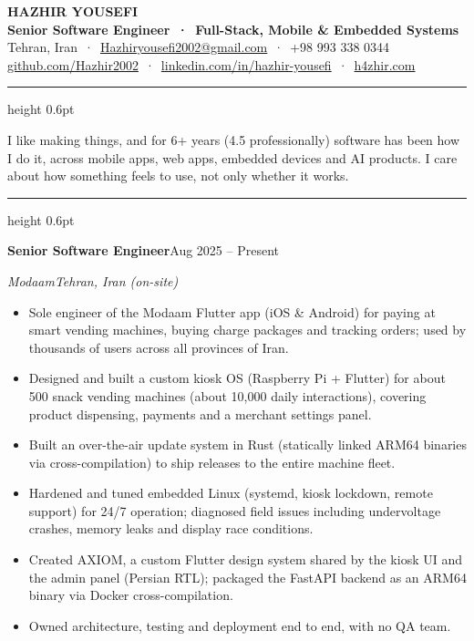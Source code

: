 \documentclass[10pt,a4paper]{article}
\renewcommand{\section}[1]{%
  \vspace{6pt}{\bfseries\color{accent}\MakeUppercase{#1}}\par\nointerlineskip\vspace{1.5pt}%
  {\color{accent}\hrule height 0.6pt}\vspace{3pt}}
\newcommand{\entry}[4]{%
  \vspace{3pt}\textbf{#1}\hfill #3\par
  \textit{#2}\hfill\textit{#4}\par\vspace{1pt}}
\begin{document}
\begin{center}
  {\fontsize{22}{26}\selectfont\bfseries HAZHIR YOUSEFI}\\[3pt]
  {\color{accent}\bfseries Senior Software Engineer \,·\, Full-Stack, Mobile \& Embedded Systems}\\[3pt]
  {\small Tehran, Iran \,·\,
  \href{mailto:Hazhiryousefi2002@gmail.com}{Hazhiryousefi2002@gmail.com} \,·\,
  +98 993 338 0344}\\[1pt]
    {\small \href{https://github.com/Hazhir2002}{github.com/Hazhir2002} \,·\,
  \href{https://linkedin.com/in/hazhir-yousefi-665906232}{linkedin.com/in/hazhir-yousefi} \,·\,
  \href{https://h4zhir.com}{h4zhir.com}}
\end{center}

\section{Summary}
I like making things, and for 6+ years (4.5 professionally) software has been how I do it, across mobile apps,
web apps, embedded devices and AI products. I care about how something feels to use, not only whether it works.

\section{Experience}

\entry{Senior Software Engineer}{Modaam}{Aug 2025 -- Present}{Tehran, Iran (on-site)}
\begin{itemize}
  \item Sole engineer of the Modaam Flutter app (iOS \& Android) for paying at smart vending machines, buying
        charge packages and tracking orders; used by thousands of users across all provinces of Iran.
  \item Designed and built a custom kiosk OS (Raspberry Pi + Flutter) for about 500 snack vending machines
        (about 10,000 daily interactions), covering product dispensing, payments and a merchant settings panel.
  \item Built an over-the-air update system in Rust (statically linked ARM64 binaries via cross-compilation)
        to ship releases to the entire machine fleet.
  \item Hardened and tuned embedded Linux (systemd, kiosk lockdown, remote support) for 24/7 operation; diagnosed
        field issues including undervoltage crashes, memory leaks and display race conditions.
  \item Created AXIOM, a custom Flutter design system shared by the kiosk UI and the admin panel (Persian RTL);
        packaged the FastAPI backend as an ARM64 binary via Docker cross-compilation.
  \item Owned architecture, testing and deployment end to end, with no QA team.
\end{itemize}
\end{document}
